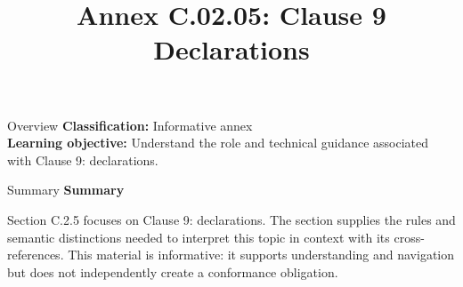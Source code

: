 \documentclass[10pt,letterpaper]{article}
\title{Annex C.02.05: Clause 9 Declarations}
\author{}
\date{}
\begin{document}
\maketitle
\begin{CornellOverviewBox}{Overview}
\textbf{Classification:} Informative annex\\[2pt]
\textbf{Learning objective:} Understand the role and technical guidance associated with Clause 9: declarations.
\end{CornellOverviewBox}\begin{CornellSummaryBox}{Summary}
{\sffamily\bfseries\color{Accent} Summary}\par\vspace{3pt}Section C.2.5 focuses on Clause 9: declarations. The section supplies the rules and semantic distinctions needed to interpret this topic in context with its cross-references. This material is informative: it supports understanding and navigation but does not independently create a conformance obligation.
\end{CornellSummaryBox}
\end{document}
